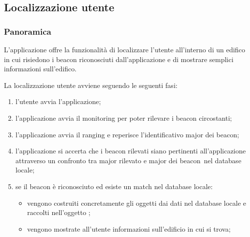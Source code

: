 \documentclass[../Funzionalita.tex]{subfiles}
\begin{document}
\subsection{Localizzazione utente}
\label{subsec:LocalizzazioneUtente}
		
		\subsubsection{Panoramica}
			L'applicazione offre la funzionalità di localizzare l'utente all'interno di un edifico in cui risiedono i \gls{beacon} riconosciuti dall'applicazione e di mostrare semplici informazioni sull'edifico.
			
			La localizzazione utente avviene seguendo le seguenti fasi:
			\begin{enumerate}
				\item l'utente avvia l'applicazione;
				\item l'applicazione avvia il \gls{monitoring} per poter rilevare i \gls{beacon} circostanti;
				\item l'applicazione avvia il \gls{ranging} e reperisce l'identificativo major dei \gls{beacon};
				\item l'applicazione si accerta che i \gls{beacon} rilevati siano pertinenti all'applicazione attraverso un confronto tra major rilevato e major dei \gls{beacon}\ 
nel database locale;
				\item se il \gls{beacon} è riconosciuto ed esiste un match nel database locale:
					\begin{itemize}
						\item vengono costruiti concretamente gli oggetti dai dati nel database locale e raccolti nell'oggetto \BuildingMap;
						\item vengono mostrate all'utente informazioni sull'edificio in cui si trova;
					\end{itemize}
			\end{enumerate}
			
\end{document}

